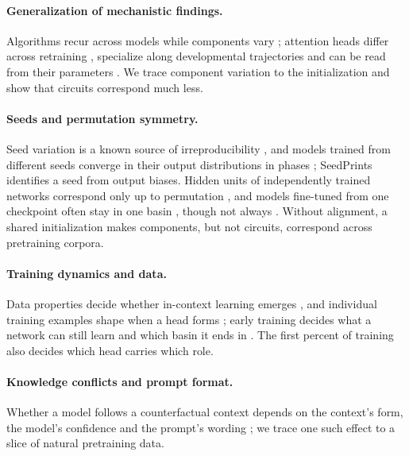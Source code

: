 \documentclass[11pt]{article}
\begin{document}
\paragraph{Generalization of mechanistic findings.}
Algorithms recur across models while components vary \citep{chughtai2023toy,gurnee2024universal,tigges2024llm}; attention heads differ across retraining \citep{bali2026quantifying}, specialize along developmental trajectories \citep{wang2025differentiation} and can be read from their parameters \citep{elhelo2025maps}.
We trace component variation to the initialization and show that circuits correspond much less.

\paragraph{Seeds and permutation symmetry.}
Seed variation is a known source of irreproducibility \citep{reimers2017reporting,dodge2020fine,sellam2022multiberts,vanderwal2025polypythias}, and models trained from different seeds converge in their output distributions in phases \citep{fehlauer2025convergence}; SeedPrints \citep{tong2026seedprints} identifies a seed from output biases.
Hidden units of independently trained networks correspond only up to permutation \citep{li2016convergent,entezari2022role,ainsworth2023git}, and models fine-tuned from one checkpoint often stay in one basin \citep{neyshabur2020transferred}, though not always \citep{juneja2023linear}.
Without alignment, a shared initialization makes components, but not circuits, correspond across pretraining corpora.

\paragraph{Training dynamics and data.}
Data properties decide whether in-context learning emerges \citep{chan2022data,singh2024needs}, and individual training examples shape when a head forms \citep{chen2026mechanistic}; early training decides what a network can still learn \citep{achille2019critical} and which basin it ends in \citep{frankle2020linear}.
The first percent of training also decides which head carries which role.

\paragraph{Knowledge conflicts and prompt format.}
Whether a model follows a counterfactual context depends on the context's form, the model's confidence and the prompt's wording \citep{longpre2021entity,xie2024adaptive,du2024context,ortu2024competition,sclar2024quantifying}; we trace one such effect to a slice of natural pretraining data.
\end{document}

